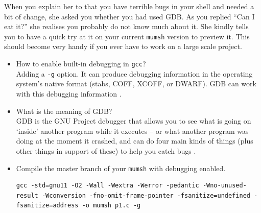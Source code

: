 \documentclass[a4paper]{article}
\begin{document}
When you explain her to that you have terrible bugs in your shell and needed a bit of change, she asked you whether you had used GDB. As you replied “Can I eat it?” she realises you probably do not know much about it. She kindly tells you to have a quick try at it on your current \texttt{mumsh} version to preview it. This should become very handy if you ever have to work on a large scale project.
\begin{itemize}
    \item How to enable built-in debugging in \texttt{gcc}?\\
    Adding a \texttt{-g} option. It can produce debugging information in the operating system’s native format (stabs, COFF, XCOFF, or DWARF). GDB can work with this debugging information \cite{gcc}.
    \item What is the meaning of GDB?\\
    GDB is the GNU Project debugger that allows you to see what is going on `inside' another program while it executes -- or what another program was doing at the moment it crashed, and can do four main kinds of things (plus other things in support of these) to help you catch bugs \cite{gdb}.
    \item Compile the master branch of your \texttt{mumsh} with debugging enabled.
    \begin{verbatim}
gcc -std=gnu11 -O2 -Wall -Wextra -Werror -pedantic -Wno-unused-result -Wconversion -fno-omit-frame-pointer -fsanitize=undefined -fsanitize=address -o mumsh p1.c -g
    \end{verbatim}
\end{itemize}
\end{document}
